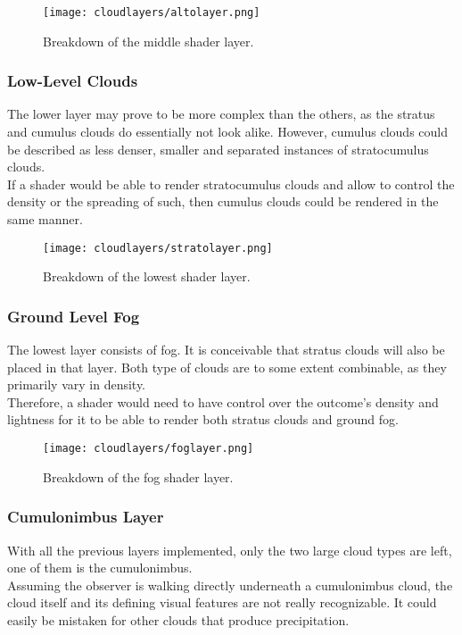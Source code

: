 \begin{figure}[H]
    \texttt{[image: cloudlayers/altolayer.png]}
    \caption{Breakdown of the middle shader layer.}
    \label{img:cloudlayer:alto}
\end{figure}

\pagebreak

\subsubsection{Low-Level Clouds}
The lower layer may prove to be more complex than the others, as the stratus and cumulus clouds do essentially not look alike.
However, cumulus clouds could be described as less denser, smaller and separated instances of stratocumulus clouds.
\\
If a \gls{shader} would be able to render stratocumulus clouds and allow to control the density or the spreading of such, then cumulus clouds could be rendered in the same manner.

\begin{figure}[H]
    \texttt{[image: cloudlayers/stratolayer.png]}
    \caption{Breakdown of the lowest shader layer.}
    \label{img:cloudlayer:alto}
\end{figure}


\subsubsection{Ground Level Fog}
The lowest layer consists of fog. It is conceivable that stratus clouds will also be placed in that layer.
Both type of clouds are to some extent combinable, as they primarily vary in density.
\\
Therefore, a \gls{shader} would need to have control over the outcome's density and lightness for it to be able to render both stratus clouds and ground fog.

\begin{figure}[H]
    \texttt{[image: cloudlayers/foglayer.png]}
    \caption{Breakdown of the fog shader layer.}
    \label{img:cloudlayer:fog}
\end{figure}

\pagebreak

\subsubsection{Cumulonimbus Layer}
With all the previous layers implemented, only the two large cloud types are left, one of them is the cumulonimbus.
\\
Assuming the observer is walking directly underneath a cumulonimbus cloud, the cloud itself and its defining visual features are not really recognizable.
It could easily be mistaken for other clouds that produce \gls{precipitation}.

